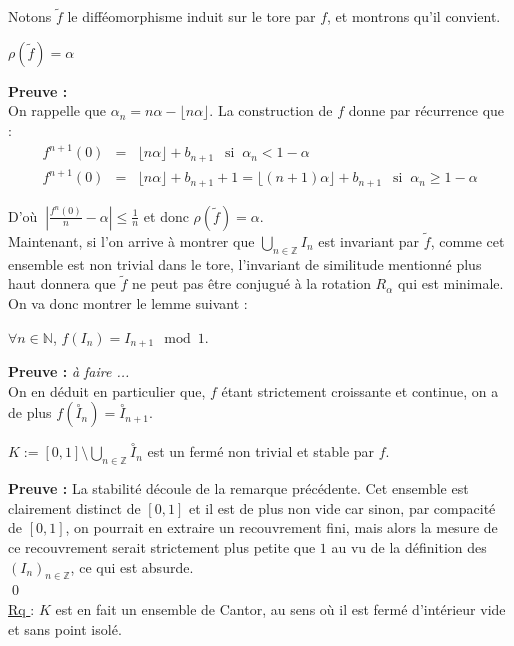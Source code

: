 \documentclass[11pt,a4paper]{article}
\begin{document}
Notons $\tilde{f}$ le difféomorphisme induit sur le tore par $f$, et montrons qu'il convient. 

\begin{lemma} $\rho(\tilde{f})=\alpha$
\end{lemma}

\textbf{Preuve :} \\
On rappelle que $\alpha_n = n\alpha - \lfloor n\alpha \rfloor$. La construction de $f$ donne par récurrence que :
\begin{eqnarray*}
f^{n+1}(0) &=& \lfloor n\alpha \rfloor + b_{n+1} \ \ \text{ si } \ \alpha_n < 1-\alpha \\
f^{n+1}(0) &=&  \lfloor n\alpha \rfloor + b_{n+1} + 1 =  \lfloor (n+1)\alpha \rfloor + b_{n+1}\ \ \text{ si } \ \alpha_n \geq 1-\alpha
\end{eqnarray*}

D'où $ \ \displaystyle |\frac{f^n(0)}{n} - \alpha| \leq \frac{1}{n}$ et donc $\rho(\tilde{f})=\alpha$. \\


Maintenant, si l'on arrive à montrer que $\bigcup_{n\in \mathbb{Z}} I_n$ est invariant par $\tilde{f}$, comme cet ensemble est non trivial dans le tore, l'invariant de similitude mentionné plus haut donnera que $\tilde{f}$ ne peut pas être conjugué à la rotation $R_\alpha$ qui est minimale. On va donc montrer le lemme suivant :

\begin{lemma} $\forall n \in \mathbb{N}$, $f(I_n)=I_{n+1} \mod 1$.
\end{lemma}


\textbf{Preuve :} \textit{à faire ...} \\

On en déduit en particulier que, $f$ étant strictement croissante et continue, on a de plus $f(\overset{\circ}I_n)=\overset{\circ}I_{n+1}$.

\begin{lemma} $K := \displaystyle [0,1] \setminus \bigcup_{n\in \mathbb{Z}} \overset{\circ} I_n$ est un fermé non trivial et stable par $f$.
\end{lemma}


\textbf{Preuve :} La stabilité découle de la remarque précédente. Cet ensemble est clairement distinct de $[0,1]$ et il est de plus non vide car sinon, par compacité de $[0,1]$, on pourrait en extraire un recouvrement fini, mais alors la mesure de ce recouvrement serait strictement plus petite que $1$ au vu de la définition des $(I_n)_{n\in\mathbb{Z}}$, ce qui est absurde. \\ \qed  ~\\

\underline{Rq }: $K$ est en fait un ensemble de Cantor, au sens où il est fermé d'intérieur vide et sans point isolé.
\newpage
\printbibliography[heading=bibintoc, title={Références}]
\end{document}
